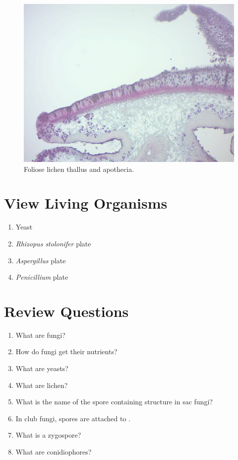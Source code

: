 \begin{figure}

{\centering \includegraphics[width=0.7\linewidth]{./figures/fungi/foliose_lichen}

}

\caption{Foliose lichen thallus and apothecia.}\label{fig:lichen}
\end{figure}

\section{View Living Organisms}\label{view-living-organisms}

\begin{enumerate}
\def\labelenumi{\arabic{enumi}.}
\tightlist
\item
  Yeast
\item
  \emph{Rhizopus stolonifer} plate
\item
  \emph{Aspergillus} plate
\item
  \emph{Penicillium} plate
\end{enumerate}

\section{Review Questions}\label{review-questions}

\begin{enumerate}
\def\labelenumi{\arabic{enumi}.}
\tightlist
\item
  What are fungi?
\item
  How do fungi get their nutrients?
\item
  What are yeasts?
\item
  What are lichen?
\item
  What is the name of the spore containing structure in sac fungi?
\item
  In club fungi, spores are attached to \underline{\phantom{answer}}.
\item
  What is a zygospore?
\item
  What are conidiophores?
\end{enumerate}
